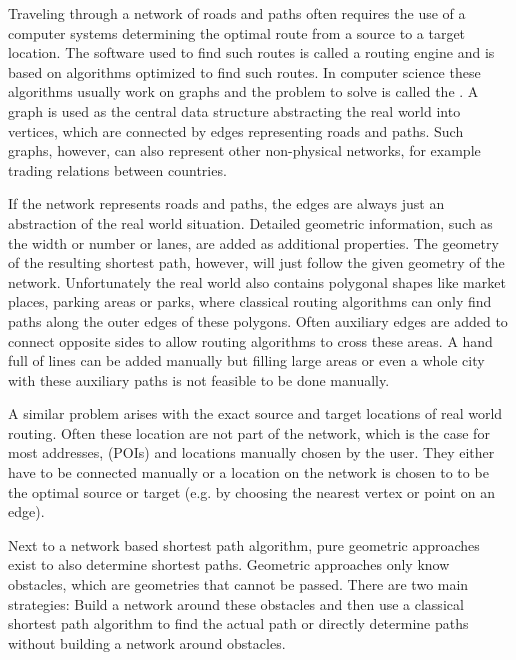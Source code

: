 
Traveling through a network of roads and paths often requires the use of a computer systems determining the optimal route from a source to a target location.
The software used to find such routes is called a routing engine and is based on algorithms optimized to find such routes.
In computer science these algorithms usually work on graphs and the problem to solve is called the .
A graph is used as the central data structure abstracting the real world into vertices, which are connected by edges representing roads and paths.
Such graphs, however, can also represent other non-physical networks, for example trading relations between countries\citationNeeded.

If the network represents roads and paths, the edges are always just an abstraction of the real world situation.
Detailed geometric information, such as the width or number or lanes, are added as additional properties.
The geometry of the resulting shortest path, however, will just follow the given geometry of the network.
Unfortunately the real world also contains polygonal shapes like market places, parking areas or parks, where classical routing algorithms can only find paths along the outer edges of these polygons.
Often auxiliary edges are added to connect opposite sides to allow routing algorithms to cross these areas.
A hand full of lines can be added manually but filling large areas or even a whole city with these auxiliary paths is not feasible to be done manually.

A similar problem arises with the exact source and target locations of real world routing.
Often these location are not part of the network, which is the case for most addresses,  (POIs) and locations manually chosen by the user.
They either have to be connected manually or a location on the network is chosen to to be the optimal source or target (e.g. by choosing the nearest  vertex or point on an edge).

Next to a network based shortest path algorithm, pure geometric approaches exist to also determine shortest paths.
Geometric approaches only know obstacles, which are geometries that cannot be passed.
There are two main strategies\citationNeeded:
Build a network around these obstacles and then use a classical shortest path algorithm to find the actual path or directly determine paths without building a network around obstacles.

